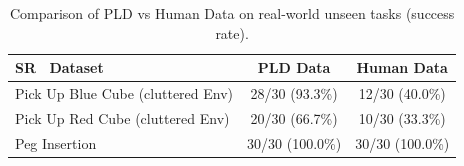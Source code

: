 \begin{table}[h]
\centering
\caption{Comparison of PLD vs Human Data on real-world unseen tasks (success rate).}
\label{tab:real-world-generalize}
\setlength{\tabcolsep}{6pt}
\begin{tabular}{lcc}
\toprule
\textbf{SR \ Dataset} & \textbf{PLD Data} & \textbf{Human Data} \\
\midrule
Pick Up Blue Cube (cluttered Env) & 28/30 (93.3\%) & 12/30 (40.0\%) \\
Pick Up Red Cube (cluttered Env) & 20/30 (66.7\%) & 10/30 (33.3\%) \\
Peg Insertion & 30/30 (100.0\%) & 30/30 (100.0\%) \\
\bottomrule
\end{tabular}
\end{table}




